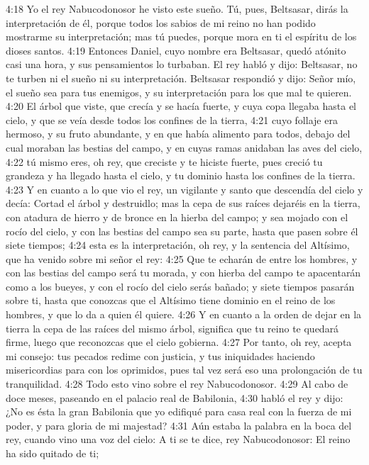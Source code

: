 4:18 Yo el rey Nabucodonosor he visto este sueño. Tú, pues, Beltsasar, dirás la interpretación de él, porque todos los sabios de mi reino no han podido mostrarme su interpretación; mas tú puedes, porque mora en ti el espíritu de los dioses santos.  
4:19 Entonces Daniel, cuyo nombre era Beltsasar, quedó atónito casi una hora, y sus pensamientos lo turbaban. El rey habló y dijo: Beltsasar, no te turben ni el sueño ni su interpretación. Beltsasar respondió y dijo: Señor mío, el sueño sea para tus enemigos, y su interpretación para los que mal te quieren.  
4:20 El árbol que viste, que crecía y se hacía fuerte, y cuya copa llegaba hasta el cielo, y que se veía desde todos los confines de la tierra,  
4:21 cuyo follaje era hermoso, y su fruto abundante, y en que había alimento para todos, debajo del cual moraban las bestias del campo, y en cuyas ramas anidaban las aves del cielo,  
4:22 tú mismo eres, oh rey, que creciste y te hiciste fuerte, pues creció tu grandeza y ha llegado hasta el cielo, y tu dominio hasta los confines de la tierra.  
4:23 Y en cuanto a lo que vio el rey, un vigilante y santo que descendía del cielo y decía: Cortad el árbol y destruidlo; mas la cepa de sus raíces dejaréis en la tierra, con atadura de hierro y de bronce en la hierba del campo; y sea mojado con el rocío del cielo, y con las bestias del campo sea su parte, hasta que pasen sobre él siete tiempos;  
4:24 esta es la interpretación, oh rey, y la sentencia del Altísimo, que ha venido sobre mi señor el rey:  
4:25 Que te echarán de entre los hombres, y con las bestias del campo será tu morada, y con hierba del campo te apacentarán como a los bueyes, y con el rocío del cielo serás bañado; y siete tiempos pasarán sobre ti, hasta que conozcas que el Altísimo tiene dominio en el reino de los hombres, y que lo da a quien él quiere.  
4:26 Y en cuanto a la orden de dejar en la tierra la cepa de las raíces del mismo árbol, significa que tu reino te quedará firme, luego que reconozcas que el cielo gobierna.  
4:27 Por tanto, oh rey, acepta mi consejo: tus pecados redime con justicia, y tus iniquidades haciendo misericordias para con los oprimidos, pues tal vez será eso una prolongación de tu tranquilidad.  
4:28 Todo esto vino sobre el rey Nabucodonosor.  
4:29 Al cabo de doce meses, paseando en el palacio real de Babilonia,  
4:30 habló el rey y dijo: ¿No es ésta la gran Babilonia que yo edifiqué para casa real con la fuerza de mi poder, y para gloria de mi majestad?  
4:31 Aún estaba la palabra en la boca del rey, cuando vino una voz del cielo: A ti se te dice, rey Nabucodonosor: El reino ha sido quitado de ti;  
